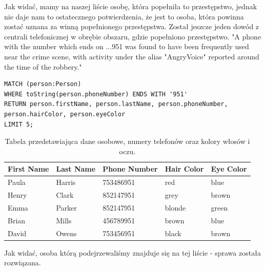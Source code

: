\documentclass[a4paper,12pt]{article}
\begin{document}
Jak widać, mamy na naszej liście osobę, która popełniła to przestępstwo, jednak nie daje nam to ostatecznego potwierdzenia, że jest to osoba, która powinna zostać uznana za winną popełnionego przestępstwa. Został jeszcze jeden dowód z centrali telefonicznej w obrębie obszaru, gdzie popełniono przestępstwo.
\newline
\newline
"A phone with the number which ends on ...951 was found to have been frequently used near the crime scene, with activity under the alias "AngryVoice" reported around the time of the robbery."

\begin{center}
\begin{minipage}{0.8\linewidth}
\begin{lstlisting}[language=Cypher, basicstyle=\small, breaklines=true]
MATCH (person:Person)
WHERE toString(person.phoneNumber) ENDS WITH '951'
RETURN person.firstName, person.lastName, person.phoneNumber, person.hairColor, person.eyeColor
LIMIT 5;
\end{lstlisting}
\end{minipage}
\end{center}
\newpage
\begin{table}[h!]
\centering
\begin{tabular}{|l|l|l|l|l|}
\hline
\textbf{First Name} & \textbf{Last Name} & \textbf{Phone Number} & \textbf{Hair Color} & \textbf{Eye Color} \\ \hline
Paula              & Harris             & 753486951             & red                 & blue               \\ \hline
Henry              & Clark              & 852147951             & grey                & brown              \\ \hline
Emma               & Parker             & 852147951             & blonde              & green              \\ \hline
Brian              & Mills              & 456789951             & brown               & blue               \\ \hline
David              & Owens              & 753456951             & black               & brown              \\ \hline
\end{tabular}
\caption{Tabela przedstawiająca dane osobowe, numery telefonów oraz kolory włosów i oczu.}
\label{tab:person_data}
\end{table}

Jak widać, osoba którą podejrzewaliśmy znajduje się na tej liście - sprawa została rozwiązana.
\end{document}
